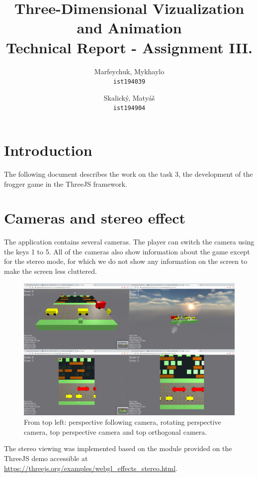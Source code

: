 \documentclass[a4paper,10pt, twocolumn]{article}
\title{Three-Dimensional Vizualization and Animation\\Technical Report - Assignment III.}
\author{
  Marfeychuk, Mykhaylo\\
  \texttt{ist194039}
  \and
  Skalický, Matyáš\\
  \texttt{ist194904}
}
\date{} %
\begin{document}
\maketitle


\section*{Introduction}
The following document describes the work on the task 3, the development of the frogger game in the ThreeJS framework.

\section{Cameras and stereo effect}
The application contains several cameras. The player can switch the camera using the keys 1 to 5. All of the cameras also show information about the game except for the stereo mode, for which we do not show any information on the screen to make the screen less cluttered.

\begin{figure}[!htb]
	\centering
 	\includegraphics[width=\linewidth]{images/cam_merged.png}
  	\caption{From top left: perspective following camera, rotating perspective camera, top perspective camera and top orthogonal camera.}
	\label{cameras}
\end{figure}

The stereo viewing was implemented based on the module provided on the ThreeJS demo accessible at \url{https://threejs.org/examples/webgl_effects_stereo.html}. 
\end{document}
